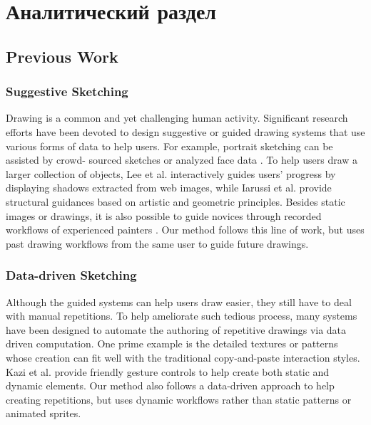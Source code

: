 \chapter{Аналитический раздел}
\label{cha:analysis}
%
%
\section{Previous Work}
\subsection{Suggestive Sketching}
Drawing is a common and yet challenging human activity. Significant research efforts have been devoted to design suggestive or guided drawing systems that use various forms of data to help users. For example, portrait sketching can be assisted by crowd- sourced sketches \cite{bib1} or analyzed face data \cite{bib1}. To help users draw a larger collection of objects, Lee et al. \cite{bib1} interactively guides users’ progress by displaying shadows extracted from web images, while Iarussi et al. \cite{bib1} provide structural guidances based on artistic and geometric principles. Besides static images or drawings, it is also possible to guide novices through recorded workflows of experienced painters \cite{bib1}.
Our method follows this line of work, but uses past drawing workflows from the same user to guide future drawings.

\subsection{Data-driven Sketching}
Although the guided systems can help users draw easier, they still have to deal with manual repetitions. To help ameliorate such tedious process, many systems have been designed to automate the authoring of repetitive drawings via data driven computation. One prime example is the detailed textures or patterns  \cite{bib1} \cite{bib1} \cite{bib1} \cite{bib1} whose creation can fit well with the traditional copy-and-paste interaction styles. Kazi et al.  \cite{bib1} \cite{bib1} provide friendly gesture controls to help create both static and dynamic elements.
Our method also follows a data-driven approach to help creating repetitions, but uses dynamic workflows rather than static patterns or animated sprites.

